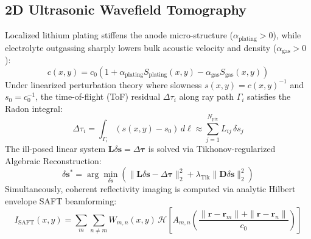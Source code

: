 \documentclass[journal]{IEEEtran}
\begin{document}
\subsection{2D Ultrasonic Wavefield Tomography}
Localized lithium plating stiffens the anode micro-structure ($\alpha_{\text{plating}} > 0$), while electrolyte outgassing sharply lowers bulk acoustic velocity and density ($\alpha_{\text{gas}} > 0$):
\begin{equation}
c(x, y) = c_0 \left(1 + \alpha_{\text{plating}} S_{\text{plating}}(x, y) - \alpha_{\text{gas}} S_{\text{gas}}(x, y)\right)
\label{eq:acoustic_c}
\end{equation}
Under linearized perturbation theory where slowness $s(x, y) = c(x, y)^{-1}$ and $s_0 = c_0^{-1}$, the time-of-flight (ToF) residual $\Delta \tau_i$ along ray path $\Gamma_i$ satisfies the Radon integral:
\begin{equation}
\Delta \tau_i = \int_{\Gamma_i} (s(x, y) - s_0) \, d\ell \approx \sum_{j=1}^{N_{\text{pix}}} L_{ij} \, \delta s_j
\label{eq:radon}
\end{equation}
The ill-posed linear system $\mathbf{L} \delta \mathbf{s} = \Delta \boldsymbol{\tau}$ is solved via Tikhonov-regularized Algebraic Reconstruction:
\begin{equation}
\delta \mathbf{s}^* = \arg\min_{\delta \mathbf{s}} \left( \|\mathbf{L} \delta \mathbf{s} - \Delta \boldsymbol{\tau}\|_2^2 + \lambda_{\text{Tik}} \|\mathbf{D} \delta \mathbf{s}\|_2^2 \right)
\label{eq:sart_tikhonov}
\end{equation}
Simultaneously, coherent reflectivity imaging is computed via analytic Hilbert envelope SAFT beamforming:
\begin{equation}
I_{\text{SAFT}}(x, y) = \sum_{m} \sum_{n \neq m} W_{m,n}(x,y) \, \mathcal{H}\left[A_{m,n}\left(\frac{\|\mathbf{r}-\mathbf{r}_m\| + \|\mathbf{r}-\mathbf{r}_n\|}{c_0}\right)\right]
\label{eq:saft}
\end{equation}
\end{document}
